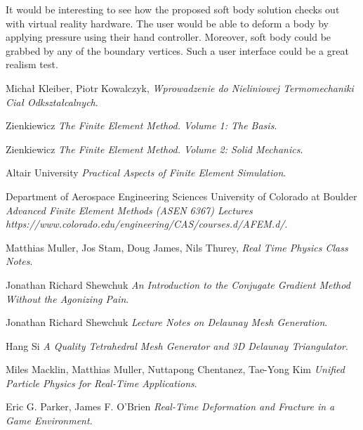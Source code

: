 \documentclass[en]{minipw} %
\begin{document}
It would be interesting to see how the proposed soft body solution checks out with virtual reality hardware. The user would be able to deform a body by applying pressure using their hand controller. Moreover, soft body could be grabbed by any of the boundary vertices. Such a user interface could be a great realism test.



\begin{thebibliography}{20}%


 Michał Kleiber, Piotr Kowalczyk, \emph{Wprowadzenie do Nieliniowej Termomechaniki Ciał Odkształcalnych}.

 Zienkiewicz \emph{The Finite Element Method. Volume 1: The Basis}.

 Zienkiewicz \emph{The Finite Element Method. Volume 2: Solid Mechanics}.

 Altair University \emph{Practical Aspects of Finite Element Simulation}.

 Department of Aerospace Engineering Sciences University of Colorado at Boulder \emph{Advanced Finite Element Methods (ASEN 6367) Lectures https://www.colorado.edu/engineering/CAS/courses.d/AFEM.d/}.


 Matthias Muller, Jos Stam, Doug James, Nils Thurey, \emph{Real Time Physics Class Notes}.

 Jonathan Richard Shewchuk \emph{An Introduction to the Conjugate Gradient Method Without the Agonizing Pain}.

 Jonathan Richard Shewchuk \emph{Lecture Notes on Delaunay Mesh Generation}.

 Hang Si \emph{A Quality Tetrahedral Mesh Generator and 3D Delaunay Triangulator}.


 Miles Macklin, Matthias Muller, Nuttapong Chentanez, Tae-Yong Kim \emph{Unified Particle Physics for Real-Time Applications}.

 Eric G. Parker, James F. O'Brien \emph{Real-Time Deformation and Fracture in a Game Environment}.


\end{thebibliography}
\end{document}
